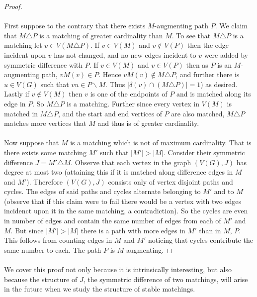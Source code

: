 \begin{proof}
\paragraph{} First suppose to the contrary that there exists $M$-augmenting path $P$. We claim that $M \triangle P$ is a matching of greater cardinality than $M$. To see that $M \triangle P$ is a matching let $v \in V(M \triangle P)$. If $v \in V(M)$ and $v \not\in V(P)$ then the edge incident upon $v$ has not changed, and no new edges incident to $v$ were added by symmetric difference with $P$. If $v \in V(M)$ and $v \in V(P)$ then as $P$ is an $M$-augmenting path, $vM(v) \in P$. Hence $vM(v) \notin M \triangle P$, and further there is $u \in V(G)$ such that $vu \in P\backslash M$. Thus $|\delta(v) \cap (M\triangle P)| =1$) as desired. Lastly if $v \not\in V(M)$ then $v$ is one of the endpoints of $P$ and is matched along its edge in $P$. So $M \triangle P$ is a matching. Further since every vertex in $V(M)$ is matched in $M \triangle P$, and the start and end vertices of $P$ are also matched, $M \triangle P$ matches more vertices that $M$ and thus is of greater cardinality.
\paragraph{}
Now suppose that $M$ is a matching which is not of maximum cardinality. That is there exists some matching $M'$ such that $|M'| > |M|$. Consider their symmetric difference $J = M' \triangle M$. Observe that each vertex in the graph $(V(G), J)$ has degree at most two (attaining this if it is matched along difference edges in $M$ and $M'$). Therefore $(V(G), J)$ consists only of vertex disjoint paths and cycles. The edges of said paths and cycles alternate belonging to $M'$ and to $M$ (observe that if this claim were to fail there would be a vertex with two edges incidenct upon it in the same matching, a contradiction). So the cycles are even in number of edges and contain the same number of edges from each of $M'$ and $M$. But since $|M'| > |M|$ there is a path with more edges in $M'$ than in $M$, $P$. This follows from counting edges in $M$ and $M'$ noticing that cycles contribute the same number to each. The path $P$ is $M$-augmenting.
\end{proof}
\paragraph{}
We cover this proof not only because it is intrinsically interesting, but also because the structure of $J$, the symmetric difference of two matchings, will arise in the future when we study the structure of stable matchings.
